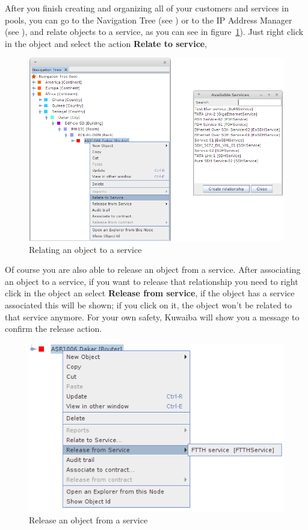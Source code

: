 \documentclass[a4paper]{article}
\begin{document}
	After you finish creating and organizing all of your customers and services in pools, you can go to the Navigation Tree (see \textbf{}) or to the IP Address Manager (see \textbf{}), and relate objects to a service, as you can see in figure~\ref{fig:sm_relate_to_service}). Just right click in the object and select the action \textbf{Relate to service},
	\begin{figure}[h!]
		\centering
		\includegraphics[width=0.9\linewidth]{img/sm_relate_to_service.png}
		\caption{Relating an object to a service}
		\label{fig:sm_relate_to_service}
	\end{figure}
	
	\newpage
	Of course you are also able to release an object from a service. After associating an object to a service, if you want to release that relationship you need to right click in the object an select  \textbf{Release from service}, if the object has a service associated this will be shown; if you click on it, the object won't be related to that service anymore. For your own safety, Kuwaiba will show you a message to confirm the release action.
	
	\begin{figure}[h!]
		\centering
		\includegraphics[width=0.5\linewidth]{img/sm_release_from_service.png}
		\caption{Release an object from a service}
		\label{fig:sm_release_from_service}
	\end{figure}
	
\end{document}
